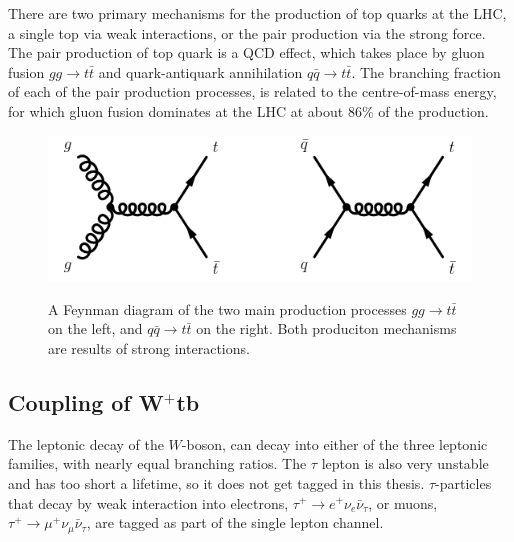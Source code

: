 \documentclass[12pt,a4paper]{article}
\numberwithin{equation}{section}
\begin{document}
There are two primary mechanisms for the production of top quarks at the LHC, a
single top via weak interactions, or the pair production via the strong force.
The pair production of top quark is a QCD effect, which takes place by gluon
fusion $gg \rightarrow t\bar t$ and quark-antiquark annihilation $q\bar q \rightarrow t\bar t$. The
branching fraction of each of the pair production processes, is related to the
centre-of-mass energy, for which gluon fusion dominates at the LHC at about 86\%
of the production\cite{dasilva2016quark}.
\begin{figure}[H]
  \centering
	\includegraphics[width=\linewidth]{figures/placeholder_feynman_ttproduction.png}\\
	\caption{A Feynman diagram of the two main production processes $gg \rightarrow t\bar t$
    on the left, and $q\bar q \rightarrow t\bar t$ on the right. Both produciton
    mechanisms are results of strong interactions.}\label{fig:ttproduction}
\end{figure}

\subsection{Coupling of W$^+$tb}\label{sec:coupling}
The leptonic decay of the $W$-boson, can decay into either of the three leptonic
families, with nearly equal branching ratios. The $\tau$ lepton is also very
unstable and has too short a lifetime, so it does not get tagged in this thesis.
$\tau$-particles that decay by weak interaction into electrons,
$\tau^+ \rightarrow e^+ \nu_e \bar \nu_{\tau}$, or muons, $\tau^+ \rightarrow \mu^+ \nu_\mu \bar \nu_{\tau}$, are tagged as part of
the single lepton channel.\\
\end{document}

